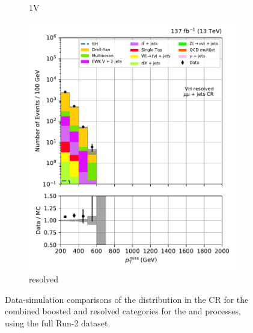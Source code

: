\begin{figure}[htbp]
\begin{subfigure}[b]{0.24\textwidth}
        \caption{\VH 1V}
    \end{subfigure}
    \hfill
    \begin{subfigure}[b]{0.24\textwidth}
        \includegraphics[width=\textwidth]{figures/region_plots/full_Run2/region_2/VH_resolved.pdf}
        \caption{\VH resolved}
    \end{subfigure}
    \caption[Data-simulation comparisons of the \ptmiss distribution in the \doubleMuCr control region for the combined boosted and resolved categories for the \ttH and \VH processes, using the full Run-2 dataset]{Data-simulation comparisons of the \ptmiss distribution in the \doubleMuCr \gls{CR} for the combined boosted and resolved categories for the \ttH and \VH processes, using the full Run-2 dataset.}
    \label{fig:htoinv_cr_yields_comb2016to18_double_muon}
\end{figure}

